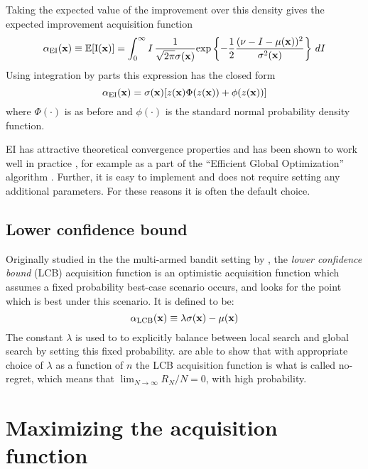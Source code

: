 Taking the expected value of the improvement over this density gives the expected improvement acquisition function
%
\begin{equation}
\alpha_{\mathrm{EI}}(\mathbf{x})
\equiv \mathbb{E}[ \mathrm{I}(\mathbf{x}) ] 
= \int_0^\infty I \, \frac{1}{\sqrt{2\pi}\sigma(\mathbf{x})} \textrm{exp} \left \{ -\frac{1}{2} \frac{(\nu - I - \mu(\mathbf{x}))^2}{\sigma^2(\mathbf{x})} \right \} \, dI
\end{equation}
%
Using integration by parts \citep{schonlau1996global} this expression has the closed form
%
\begin{equation} \label{eq:ei}
\alpha_{\mathrm{EI}}(\mathbf{x}) = \sigma(\mathbf{x})[z(\mathbf{x})\Phi(z(\mathbf{x})) + \phi(z(\mathbf{x}))]
\end{equation}
%
where $\Phi(\cdot)$ is as before and $\phi(\cdot)$ is the standard normal probability density function. 

EI has attractive theoretical convergence properties \citep{bull2011convergence} and has been shown to work well in practice \citep{snoek2012practical}, for example as a part of the ``Efficient Global Optimization'' algorithm \citep{jones1998efficient}. Further, it is easy to implement and does not require setting any additional parameters. For these reasons it is often the default choice. 

\subsection{Lower confidence bound}

Originally studied in the the multi-armed bandit setting by \citet{lai1985asymptotically}, the \textit{lower confidence bound} (LCB) acquisition function \cite{srinivas2009gaussian} is an optimistic acquisition function which assumes a fixed probability best-case scenario occurs, and looks for the point which is best under this scenario. It is defined to be:
%
\begin{equation}
\alpha_{\mathrm{LCB}}(\mathbf{x}) \equiv \lambda\sigma(\mathbf{x}) - \mu(\mathbf{x})
\end{equation}
%
The constant $\lambda$ is used to to explicitly balance between local search and global search by setting this fixed probability. \citet{srinivas2009gaussian} are able to show that with appropriate choice of $\lambda$ as a function of $n$ the LCB acquisition function is what is called no-regret, which means that $\lim_{N\to\infty} R_N / N = 0$, with high probability.

\section{Maximizing the acquisition function} \label{maxacq}

